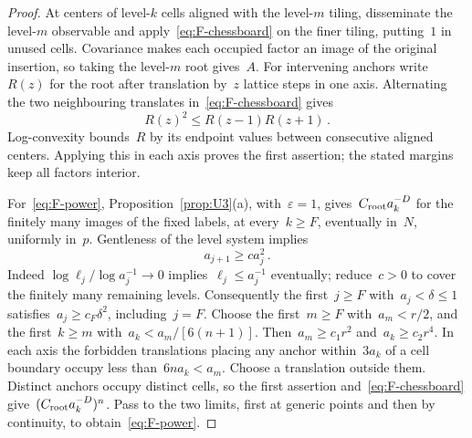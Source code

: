 \begin{proof}
At centers of level-$k$ cells aligned with the level-$m$ tiling, disseminate the level-$m$ observable and apply~\eqref{eq:F-chessboard} on the finer tiling, putting~$1$ in unused cells. Covariance makes each occupied factor an image of the original insertion, so taking the level-$m$ root gives~$A$. For intervening anchors write~$R(z)$ for the root after translation by~$z$ lattice steps in one axis. Alternating the two neighbouring translates in~\eqref{eq:F-chessboard} gives
\begin{equation*}
R(z)^2\le R(z-1)R(z+1)\,.
\end{equation*}
Log-convexity bounds~$R$ by its endpoint values between consecutive aligned centers. Applying this in each axis proves the first assertion; the stated margins keep all factors interior.

For~\eqref{eq:F-power}, Proposition~\ref{prop:U3}(a), with~$\varepsilon=1$, gives~$C_{\rm root}a_k^{-D}$ for the finitely many images of the fixed labels, at every~$k\ge F$, eventually in~$N$, uniformly in~$p$. Gentleness of the level system implies
\begin{equation}\label{eq:F-thickness}
a_{j+1}\ge c a_j^2\,.
\end{equation}
Indeed $\log\ell_j/\log a_j^{-1}\to0$ implies~$\ell_j\le a_j^{-1}$ eventually; reduce~$c>0$ to cover the finitely many remaining levels. Consequently the first~$j\ge F$ with~$a_j<\delta\le1$ satisfies~$a_j\ge c_F\delta^2$, including~$j=F$. Choose the first~$m\ge F$ with~$a_m<r/2$, and the first~$k\ge m$ with~$a_k<a_m/[6(n+1)]$. Then~$a_m\ge c_1r^2$ and~$a_k\ge c_2r^4$. In each axis the forbidden translations placing any anchor within~$3a_k$ of a cell boundary occupy less than~$6na_k<a_m$. Choose a translation outside them. Distinct anchors occupy distinct cells, so the first assertion and~\eqref{eq:F-chessboard} give~$(C_{\rm root}a_k^{-D})^n$. Pass to the two limits, first at generic points and then by continuity, to obtain~\eqref{eq:F-power}.


\end{proof}
